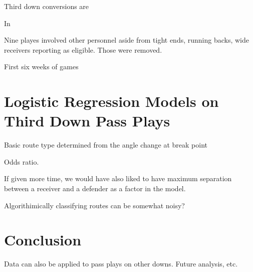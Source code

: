 \documentclass[12pt,letterpaper]{article}
\begin{document}
Third down conversions are 

In

Nine playes involved other personnel aside from tight ends, running backs, wide receivers reporting as eligible. Those were removed.

First six weeks of games

\section*{Logistic Regression Models on Third Down Pass Plays}

Basic route type determined from the angle change at break point

Odds ratio.

If given more time, we would have also liked to have maximum separation between a receiver and a defender as a factor in the model.

Algorithimically classifying routes can be somewhat noisy?

\section*{Conclusion}

Data can also be applied to pass plays on other downs. Future analysis, etc.
\end{document}
